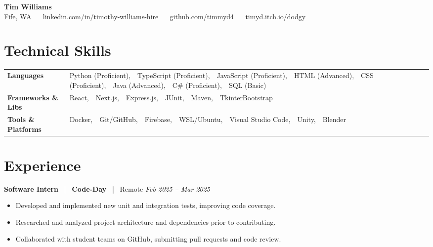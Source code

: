 \documentclass[10pt, letterpaper]{article}
\newcommand{\jobhead}[4]{%
  \vspace{5pt}%
  {\bfseries\color{dark}#1}%
  ~{\color{light}|}~%
  {\bfseries\color{navy}#2}%
  ~{\color{light}|}~%
  {\color{light}#3}%
  \hfill{\color{light}\small\textit{#4}}\\[-2pt]%
}
\newcommand{\skillrow}[2]{%
  {\bfseries #1} & #2 \\[2pt]%
}
\begin{document}

\begin{center}
  {\huge\bfseries\color{navy} Tim Williams}\\[4pt]
  {\small\color{light}
    Fife, WA
    ~\textbullet~
    \href{https://linkedin.com/in/timothy-williams-hire}{linkedin.com/in/timothy-williams-hire}
    ~\textbullet~
    \href{https://github.com/timmyd4}{github.com/timmyd4}
    ~\textbullet~
    \href{https://timyd.itch.io/dodgy}{timyd.itch.io/dodgy}
  }
\end{center}

\vspace{2pt}

\section{Technical Skills}

\begin{tabular}{@{}p{1.6in} p{5.2in}@{}}
  \skillrow{Languages}{Python (Proficient),\ \ TypeScript (Proficient),\ \ JavaScript (Proficient),\ \ HTML (Advanced),\ \ CSS (Proficient),\ \ Java (Advanced),\ \ C\# (Proficient),\ \ SQL (Basic)}
  \skillrow{Frameworks \& Libs}{React,\ \ Next.js,\ \ Express.js,\ \ JUnit,\ \ Maven,\ \ TkinterBootstrap}
  \skillrow{Tools \& Platforms}{Docker,\ \ Git/GitHub,\ \ Firebase,\ \ WSL/Ubuntu,\ \ Visual Studio Code,\ \ Unity,\ \ Blender}
\end{tabular}

\section{Experience}

\jobhead{Software Intern}{Code-Day}{Remote}{Feb 2025 – Mar 2025}
\begin{itemize}
  \item Developed and implemented new unit and integration tests, improving code coverage.
  \item Researched and analyzed project architecture and dependencies prior to contributing.
  \item Collaborated with student teams on GitHub, submitting pull requests and code review.
\end{itemize}
\end{document}
